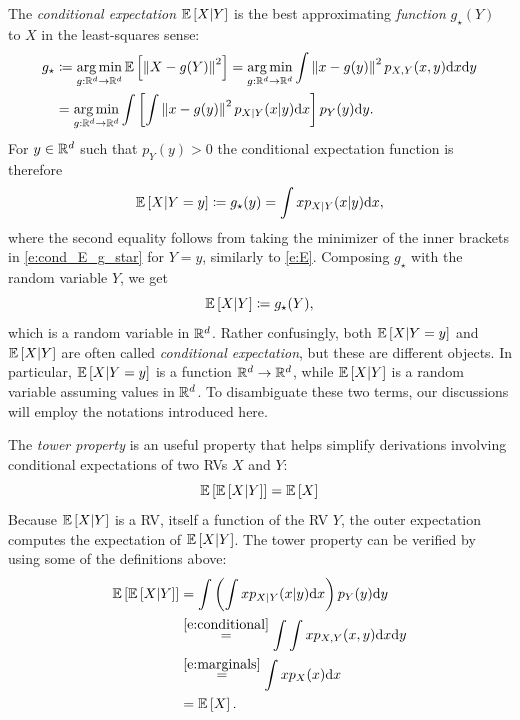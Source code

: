 The \emph{conditional expectation} $\mathbb{E}\left [X | Y\right ]$ is the best approximating \emph{function} $g_\star(Y)$ to $X$ in the least-squares sense: 
%
\begin{align}\nonumber
    g_\star &\coloneqq  \operatorname*{arg\,min}_{g:\mathbb R^d\rightarrow\mathbb R^d}\mathbb{E}\left [\left\Vert X-g(Y)\right\Vert^2\right ] =  \operatorname*{arg\,min}_{g:\mathbb R^d\rightarrow\mathbb R^d}\int \left\Vert x-g(y)\right\Vert^2 p_{X,Y}(x,y)\mathrm{d} x \mathrm{d} y \\ \label{e:cond_E_g_star}
    &= \operatorname*{arg\,min}_{g:\mathbb R^d\rightarrow\mathbb R^d} \int\left [\textcolor{black}{\int \left\Vert x-g(y)\right\Vert^2p_{X|Y}(x|y)\mathrm{d} x}\right ] p_Y(y)\mathrm{d} y.
\end{align}
%
For $y\in \mathbb R^d$ such that $p_Y(y)>0$ the conditional expectation function is therefore
%
\begin{equation}\label{e:cond_E_func}
    \E\brac{X|Y=y} \defe g_\star(y) = \int x p_{X|Y}(x|y) \dd x, %
\end{equation}
%
where the second equality follows from taking the minimizer of the inner brackets in \cref{e:cond_E_g_star} for $Y=y$, similarly to \cref{e:E}. 
%
Composing $g_\star$ with the random variable $Y$, we get 
%
\begin{equation}
    \E\brac{X|Y} \defe g_\star(Y), %
\end{equation}
%
which is a random variable in $\mathbb R^d$.
%
Rather confusingly, both $\mathbb{E}\left [X|Y=y\right ]$ and $\mathbb{E}\left [X|Y\right ]$ are often called \emph{conditional expectation}, but these are different objects.
%
In particular, $\mathbb{E}\left [X|Y=y\right ]$ is a function $\mathbb R^d\rightarrow\mathbb R^d$, while $\mathbb{E}\left [X|Y\right ]$ is a random variable assuming values in $\mathbb R^d$.
%
To disambiguate these two terms, our discussions will employ the notations introduced here. 

%

The \emph{tower property} is an useful property that helps simplify derivations involving conditional expectations of two RVs $X$ and $Y$:
%
\begin{equation}\label{e:tower}
    \E\brac{\E\brac{X|Y}} = \E\brac{X} %
\end{equation}
%
Because $\mathbb{E}\left [X|Y\right ]$ is a RV, itself a function of the RV $Y$, the outer expectation computes the expectation of $\mathbb{E}\left [X|Y\right ]$.
%
The tower property can be verified by using some of the definitions above: 
%
\begin{align*}
    \E\brac{\E\brac{X|Y}} &= \int \parr{\int x p_{X|Y}(x|y) \dd x} p_Y(y) \dd y \\
    &\overset{\eqref{e:conditional}}{=} \int \int x p_{X,Y}(x,y) \dd x\dd y \\
    &\overset{\eqref{e:marginals}}{=} \int x p_X(x)\dd x \\
    &= \E \brac{X}.
\end{align*}


